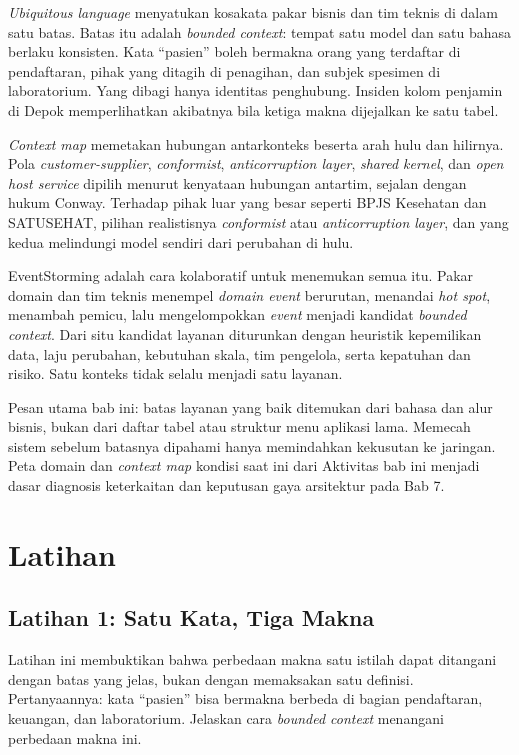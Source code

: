 \textit{Ubiquitous language} menyatukan kosakata pakar bisnis dan tim teknis di dalam satu batas.
Batas itu adalah \textit{bounded context}: tempat satu model dan satu bahasa berlaku konsisten.
Kata ``pasien'' boleh bermakna orang yang terdaftar di pendaftaran, pihak yang ditagih di penagihan,
dan subjek spesimen di laboratorium. Yang dibagi hanya identitas penghubung. Insiden kolom penjamin
di Depok memperlihatkan akibatnya bila ketiga makna dijejalkan ke satu tabel.

\textit{Context map} memetakan hubungan antarkonteks beserta arah hulu dan hilirnya. Pola
\textit{customer-supplier}, \textit{conformist}, \textit{anticorruption layer}, \textit{shared
kernel}, dan \textit{open host service} dipilih menurut kenyataan hubungan antartim, sejalan
dengan hukum Conway. Terhadap pihak luar yang besar seperti BPJS Kesehatan dan SATUSEHAT, pilihan
realistisnya \textit{conformist} atau \textit{anticorruption layer}, dan yang kedua melindungi
model sendiri dari perubahan di hulu.

EventStorming adalah cara kolaboratif untuk menemukan semua itu. Pakar domain dan tim teknis
menempel \textit{domain event} berurutan, menandai \textit{hot spot}, menambah pemicu, lalu
mengelompokkan \textit{event} menjadi kandidat \textit{bounded context}. Dari situ kandidat layanan
diturunkan dengan heuristik kepemilikan data, laju perubahan, kebutuhan skala, tim pengelola, serta
kepatuhan dan risiko. Satu konteks tidak selalu menjadi satu layanan.

Pesan utama bab ini: batas layanan yang baik ditemukan dari bahasa dan alur bisnis, bukan dari
daftar tabel atau struktur menu aplikasi lama. Memecah sistem sebelum batasnya dipahami hanya
memindahkan kekusutan ke jaringan. Peta domain dan \textit{context map} kondisi saat ini dari
Aktivitas bab ini menjadi dasar diagnosis keterkaitan dan keputusan gaya arsitektur pada Bab 7.

\section{Latihan}

\subsection*{Latihan 1: Satu Kata, Tiga Makna}

Latihan ini membuktikan bahwa perbedaan makna satu istilah dapat ditangani dengan batas yang jelas,
bukan dengan memaksakan satu definisi. Pertanyaannya: kata ``pasien'' bisa bermakna berbeda di
bagian pendaftaran, keuangan, dan laboratorium. Jelaskan cara \textit{bounded context} menangani
perbedaan makna ini.

